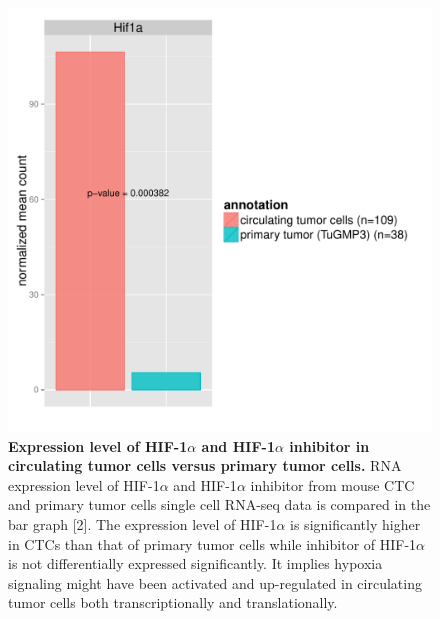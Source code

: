 \documentclass[11pts]{article}
\begin{document}
\begin{figure}
\centering	
\includegraphics[width=1\textwidth]{qualexam_HIF.pdf}
\caption{\small {\bf Expression level of HIF-1$\alpha$ and HIF-1$\alpha$ inhibitor in circulating tumor cells versus primary tumor cells. } RNA expression level of HIF-1$\alpha$ and HIF-1$\alpha$ inhibitor from mouse CTC and primary tumor cells single cell RNA-seq data is compared in the bar graph  [2]. The expression level of HIF-1$\alpha$ is significantly higher in CTCs than that of primary tumor cells while inhibitor of HIF-1$\alpha$ is not differentially expressed significantly. It implies hypoxia signaling might have been activated and up-regulated in circulating tumor cells both transcriptionally and translationally.   } 


\end{figure}
\end{document}
